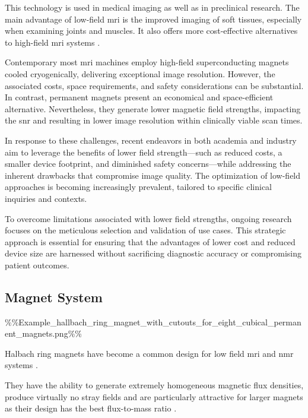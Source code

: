 This technology is used in medical imaging as well as in preclinical
research. The main advantage of low-field \gls{mri} is the improved
imaging of soft tissues, especially when examining joints and muscles.
It also offers more cost-effective alternatives to high-field \gls{mri}
systems \cite{Hori2021-pt}.

Contemporary most \gls{mri} machines employ high-field superconducting
magnets cooled cryogenically, delivering exceptional image resolution.
However, the associated costs, space requirements, and safety
considerations can be substantial. In contrast, permanent magnets
present an economical and space-efficient alternative. Nevertheless,
they generate lower magnetic field strengths, impacting the \gls{snr}
and resulting in lower image resolution within clinically viable scan
times. \cite{Arnold2023-cn}

In response to these challenges, recent endeavors in both academia and
industry aim to leverage the benefits of lower field strength---such as
reduced costs, a smaller device footprint, and diminished safety
concerns---while addressing the inherent drawbacks that compromise image
quality. The optimization of low-field approaches is becoming
increasingly prevalent, tailored to specific clinical inquiries and
contexts.

To overcome limitations associated with lower field strengths, ongoing
research focuses on the meticulous selection and validation of use
cases. This strategic approach is essential for ensuring that the
advantages of lower cost and reduced device size are harnessed without
sacrificing diagnostic accuracy or compromising patient outcomes.
\cite{Arnold2023-cn}

\hypertarget{magnet-system}{%
\subsection{Magnet System}\label{magnet-system}}

\%\%Example\_hallbach\_ring\_magnet\_with\_cutouts\_for\_eight\_cubical\_permanent\_magnets.png\%\%

Halbach ring magnets \cite{Halbach1980DesignOP} have become a common
design for low field \gls{mri} and \gls{nmr} systems
\cite{cmr.a.20165}.

They have the ability to generate extremely homogeneous magnetic flux
densities, produce virtually no stray fields and are particularly
attractive for larger magnets as their design has the best flux-to-mass
ratio \cite{Wickenbrock_2021}.

